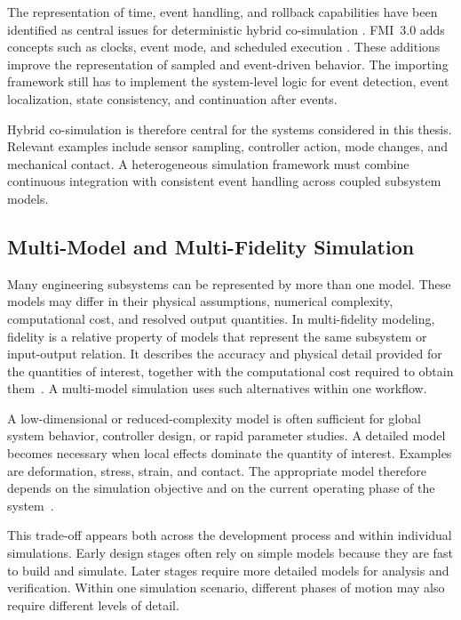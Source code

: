 The representation of time, event handling, and rollback capabilities have been identified as central issues for deterministic hybrid co-simulation \cite{StepRevision_Cremona,broman_requirements_2015,cremona_hybrid_2019}.
\ac{FMI}~3.0 adds concepts such as clocks, event mode, and scheduled execution \cite{modelica_association_project_fmi_functional_2024}.
These additions improve the representation of sampled and event-driven behavior.
The importing framework still has to implement the system-level logic for event detection, event localization, state consistency, and continuation after events.

Hybrid co-simulation is therefore central for the systems considered in this thesis.
Relevant examples include sensor sampling, controller action, mode changes, and mechanical contact.
A heterogeneous simulation framework must combine continuous integration with consistent event handling across coupled subsystem models.

\subsection{Multi-Model and Multi-Fidelity Simulation}

Many engineering subsystems can be represented by more than one model.
These models may differ in their physical assumptions, numerical complexity, computational cost, and resolved output quantities.
In multi-fidelity modeling, fidelity is a relative property of models that represent the same subsystem or input-output relation.
It describes the accuracy and physical detail provided for the quantities of interest, together with the computational cost required to obtain them~\cite{peherstorfer_survey_2018,fernandez-godino_review_2023}.
A multi-model simulation uses such alternatives within one workflow.

A low-dimensional or reduced-complexity model is often sufficient for global system behavior, controller design, or rapid parameter studies.
A detailed model becomes necessary when local effects dominate the quantity of interest.
Examples are deformation, stress, strain, and contact.
The appropriate model therefore depends on the simulation objective and on the current operating phase of the system~\cite{williams_switched-fidelity_2014,Choi2014}.

This trade-off appears both across the development process and within individual simulations.
Early design stages often rely on simple models because they are fast to build and simulate.
Later stages require more detailed models for analysis and verification.
Within one simulation scenario, different phases of motion may also require different levels of detail.

